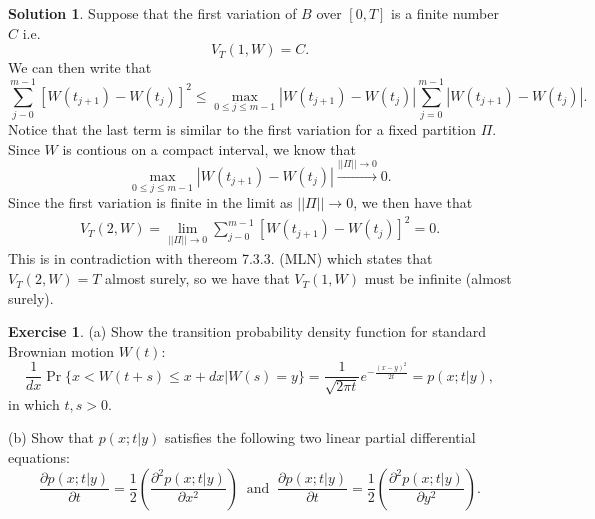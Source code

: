 \documentclass[12pt]{article}
\newcommand{\abs}[1]{ \left| #1 \right| }
\newcommand{\norm}[1]{ \left|\left| #1 \right|\right| }
\theoremstyle{definition}
\newtheorem{exer}{Exercise}
\newtheorem{sol}{Solution}
\theoremstyle{remark}
\begin{document}
\begin{sol}
    Suppose that the first variation of $B$ over $[0,T]$ is a finite number $C$ i.e.
    \begin{equation*}
        V_{T}(1, W) = C.
    \end{equation*}
    We can then write that
    \begin{equation*}
        \sum_{j-0}^{m-1}[ W(t_{j+1}) - W(t_{j})]^{2} \leq \max_{0\leq j \leq m-1} \abs{W(t_{j+1}) - W(t_{j})} \sum_{j=0}^{m-1} \abs{W(t_{j+1}) - W(t_{j})}.
    \end{equation*}
    Notice that the last term is similar to the first variation for a fixed partition $\Pi$. Since $W$ is contious on a compact interval, we know that
    \begin{equation*}
        \max_{0\leq j \leq m-1} \abs{W(t_{j+1}) - W(t_{j})} \xrightarrow{\norm{\Pi} \to 0} 0.
    \end{equation*}
    Since the first variation is finite in the limit as $\norm{\Pi} \to 0$, we then have that
    \begin{align*}
        V_{T}(2, W) =  \lim_{\norm{\Pi} \to 0} \sum_{j-0}^{m-1}[ W(t_{j+1}) - W(t_{j})]^{2}  = 0.
    \end{align*}
    This is in contradiction with thereom 7.3.3. (MLN) which states that $V_{T}(2, W) = T$ almost surely, so we have that $V_{T}(1, W)$ must be infinite  (almost surely).
\end{sol}

\newpage

\begin{exer}
 (a) Show the transition probability density function for standard
Brownian motion $W(t)$: 
\[
         \frac{1}{d x}\Pr\Big\{ x< W(t+s)\le x+ d x \Big| W(s)=y\Big\} = 
            \frac{1}{\sqrt{2\pi t}} e^{-\frac{(x-y)^2}{2t}}
= p(x;t|y),
\]
in which $t,s>0$.

(b) Show that $p(x;t|y)$ satisfies the following two linear partial differential
equations:
\[
       \frac{\partial p(x;t|y)}{\partial t} = \frac{1}{2}\left(
           \frac{\partial^2 p(x;t|y)}{\partial x^2}\right) \  \text{ and } \
    \frac{\partial p(x;t|y)}{\partial t} = \frac{1}{2}\left(
           \frac{\partial^2 p(x;t|y)}{\partial y^2}\right).
\]
\end{exer}
\end{document}
